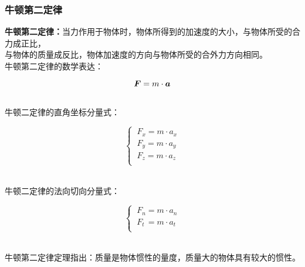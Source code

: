\documentclass[UTF8]{ctexart}
\newcommand*{\veb}[1]{\vb*{#1}}
\begin{document}
\subsubsection{牛顿第二定律}
    \textbf{牛顿第二定律：}当力作用于物体时，物体所得到的加速度的大小，与物体所受的合力成正比，\\
    与物体的质量成反比，物体加速度的方向与物体所受的合外力方向相同。\\[3mm]
    牛顿第二定律的数学表达：
    \begin{large}
        \begin{equation*}
            \veb{F}=m\cdot\veb{a}
        \end{equation*}
    \end{large}\\
    牛顿二定律的直角坐标分量式：\vspace{5pt}
    \begin{large}
        \begin{equation*}
            \begin{cases}
                ~F_x=m\cdot a_x\\[1mm]
                ~F_y=m\cdot a_y\\[1mm]
                ~F_z=m\cdot a_z\\[1mm]
            \end{cases}
        \end{equation*}
    \end{large}\\
    牛顿二定律的法向切向分量式：\vspace{5pt}
    \begin{large}
        \begin{equation*}
            \begin{cases}
                ~F_n=m\cdot a_n\\[1mm]
                ~F_t\,=m\cdot a_t\\[1mm]
            \end{cases}
        \end{equation*}
    \end{large}\\
    牛顿第二定律定理指出：质量是物体惯性的量度，质量大的物体具有较大的惯性。
\end{document}
